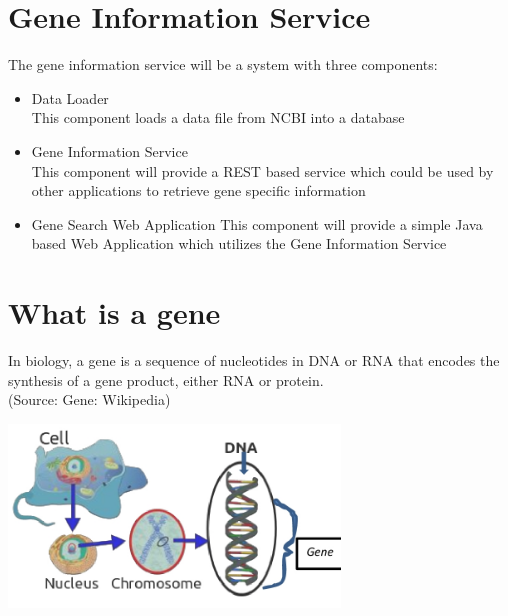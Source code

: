 

\section{Gene Information Service}
The gene information service will be a system with three components:

\begin{itemize}
\item Data Loader\\
This component loads a data file from NCBI into a database
\item Gene Information Service\\
This component will provide a REST based service which could
be used by other applications to retrieve gene specific information
\item Gene Search Web Application
This component will provide a simple Java based Web Application
which utilizes the Gene Information Service
\end{itemize}

\section{What is a gene}
In biology, a gene is a sequence of nucleotides in DNA or RNA that encodes the
synthesis of a gene product, either RNA or protein.\\
(Source: Gene: Wikipedia)

\begin{centering}
\includegraphics[width=250pt]{images/coursework/geneinfo.jpg}\\
\end{centering}

